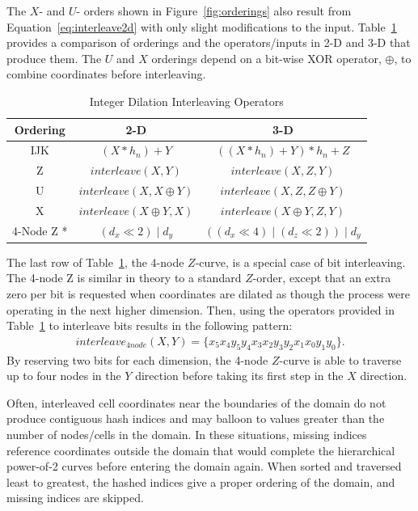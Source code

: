 \documentclass{report}
\begin{document}
The $X$- and $U$- orders shown in Figure~\ref{fig:orderings} also result from Equation~\ref{eq:interleave2d} with only slight modifications to the input. Table~\ref{tbl:orderings} provides a comparison of orderings and the operators/inputs in 2-D and 3-D that produce them. The $U$ and $X$ orderings depend on a bit-wise XOR operator, $\oplus$, to combine coordinates before interleaving. 

\begin{table}
\centering
\caption{Integer Dilation Interleaving Operators}
\label{tbl:orderings}
\begin{tabular}{ c | c | c }
  Ordering & 2-D & 3-D \\
  \hline                        
  IJK & $(X * h_n) + Y$ & $((X * h_n) + Y)*h_n + Z$ \\
  Z & $interleave(X, Y)$ & $interleave(X, Z, Y)$ \\
  U & $interleave(X, X \oplus Y)$ & $interleave(X, Z, Z \oplus Y)$ \\
  X & $interleave(X \oplus Y, X)$ & $interleave(X \oplus Y, Z, Y)$ \\
  4-Node Z * & $(d_x \ll 2) \mid d_y$ & $((d_x \ll 4) \mid (d_z \ll 2)) \mid d_y$ \\
  \hline  
\end{tabular}
\end{table}


The last row of Table~\ref{tbl:orderings}, the 4-node $Z$-curve, is a special case of bit interleaving. The 4-node Z is similar in theory to a standard $Z$-order, except that an extra zero per bit is requested when coordinates are dilated as though the process were operating in the next higher dimension. Then, using the operators provided in Table~\ref{tbl:orderings} to interleave bits results in the following pattern:
\begin{align*}
interleave_{4node}(X,Y) = \{x_5x_4y_5y_4x_3x_2y_3y_2x_1x_0y_1y_0\}.
\end{align*}
By reserving two bits for each dimension, the 4-node $Z$-curve is able to traverse up to four nodes in the $Y$ direction before taking its first step in the $X$ direction. 



Often, interleaved cell coordinates near the boundaries of the domain do not produce contiguous hash indices and may balloon to values greater than the number of nodes/cells in the domain. In these situations, missing indices reference coordinates outside the domain that would complete the hierarchical power-of-2 curves before entering the domain again. When sorted and traversed least to greatest, the hashed indices give a proper ordering of the domain, and missing indices are skipped. 
\end{document}
